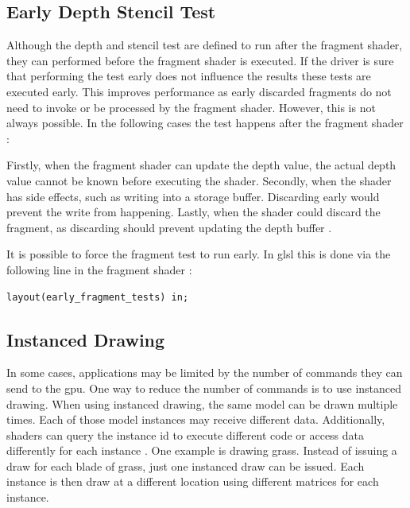\subsection{Early Depth Stencil Test}
Although the depth and stencil test are defined to run after the fragment shader, they can performed before the fragment shader is executed. If the driver is sure that performing the test early does not influence the results these tests are executed early. This improves performance as early discarded fragments do not need to invoke or be processed by the fragment shader. However, this is not always possible. In the following cases the test happens after the fragment shader \cite{sellers:vulkanprogramming}:

Firstly, when the fragment shader can update the depth value, the actual depth value cannot be known before executing the shader. Secondly, when the shader has side effects, such as writing into a storage buffer. Discarding early would prevent the write from happening. Lastly, when the shader could discard the fragment, as discarding should prevent updating the depth buffer \cite{sellers:vulkanprogramming}.

It is possible to force the fragment test to run early. In \gls{glsl} this is done via the following line in the fragment shader \cite{khronos:glsl4.60:spec}:
\begin{lstlisting}
layout(early_fragment_tests) in;
\end{lstlisting}


\subsection{Instanced Drawing}
In some cases, applications may be limited by the number of commands they can send to the \gls{gpu}. One way to reduce the number of commands is to use instanced drawing. When using instanced drawing, the same model can be drawn multiple times. Each of those model instances may receive different data. Additionally, shaders can query the instance id to execute different code or access data differently for each instance \cite{akine:2018:realtime}. One example is drawing grass. Instead of issuing a draw for each blade of grass, just one instanced draw can be issued. Each instance is then draw at a different location using different matrices for each instance.


